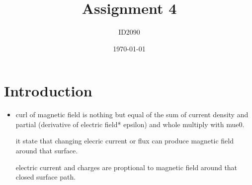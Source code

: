 \documentclass[a4paper, 12pt]{article}
\begin{document}
\title{Assignment 4}
\author{ID2090}
\date{\today}
\maketitle

\tableofcontents

\section{Introduction}
\begin{itemize}
    \item curl of magnetic field is nothing but equal of the sum of current density and partial (derivative of electric field* epsilon) and whole multiply with mue0.
    
    it state that changing elecric current or flux can produce magnetic field around that surface.
    
    electric current and charges are proptional to magnetic field around that closed surface path.
\end{itemize}


\end{document}
